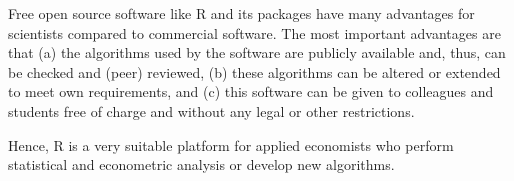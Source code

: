 \documentclass[12pt,english]{article}
\begin{document}
Free open source software like R and its packages have many advantages
for scientists compared to commercial software.
The most important advantages are that
(a) the algorithms used by the software are publicly available and, thus,
can be checked and (peer) reviewed,
(b) these algorithms can be altered or extended to meet own requirements, and
(c) this software can be given to colleagues and students free of charge and
without any legal or other restrictions.

Hence, R is a very suitable platform for applied economists who perform
statistical and econometric analysis or develop new algorithms.


%

\end{document}
